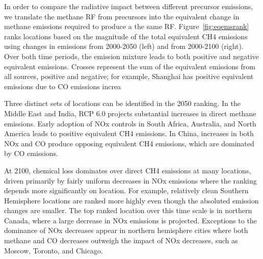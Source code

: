 In order to compare the radiative impact between different precursor emissions, we translate the methane RF from precursors into the equivalent change in methane emissions required to produce a the same RF. Figure~\ref{fig:eqemsrank} ranks locations based on the magnitude of the total equivalent CH4 emissions using changes in emissions from 2000-2050 (left) and from 2000-2100 (right). Over both time periods, the emission  mixture leads to both  positive and negative equivalent emissions. Crosses represent the sum of the equivalent emissions from all sources, positive and negative; for example, Shanghai has positive equivalent emissions due to CO emissions increa

Three distinct sets of locations can be identified in the 2050 ranking. In the Middle East and India, RCP 6.0 projects substantial increases in direct methane emissions. Early adoption of NOx controls in South Africa, Australia, and North America leads to positive equivalent CH4 emissions. In China, increases in both NOx and CO produce opposing equivalent CH4 emissions, which are dominated by  CO emissions.

At 2100, chemical loss dominates over direct CH4 emissions at many locations, driven primarily by fairly uniform decreases in NOx emissions where the ranking depends more significantly on location. For example,  relatively clean Southern Hemisphere locations are ranked more highly even though the absoluted emission changes are smaller. The top ranked location over this time scale is in northern Canada, where a large decrease in NOx emissions is projected. Exceptions to the dominance of NOx decreases appear in northern hemisphere cities where both methane and CO decreases outweigh the impact of NOx decreases, such as Moscow, Toronto, and Chicago. 

